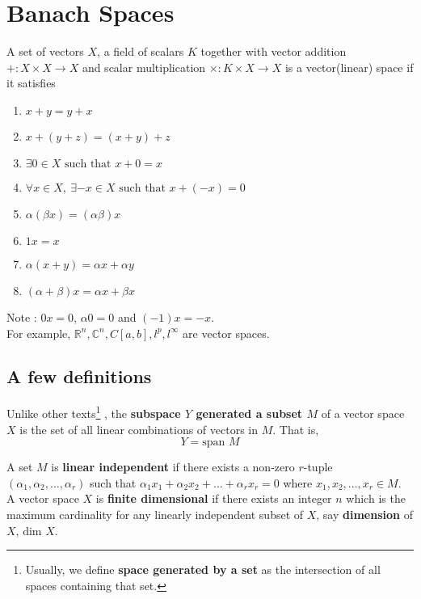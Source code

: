 \section{Banach Spaces}
\begin{definition}
	A set of vectors $X$, a field of scalars $K$ together with vector addition $+ : X \times X \to X$ and scalar multiplication $\times : K \times X \to X$ is a vector(linear) space if it satisfies
	\begin{enumerate}
		\item $x+y = y+x$
		\item $x+(y+z) = (x+y)+z$
		\item $\exists 0 \in X \text{ such that } x+0=x$
		\item $\forall x \in X,\ \exists -x \in X \text{ such that } x+(-x) = 0$
		\item $\alpha (\beta x) = (\alpha\beta)x$
		\item $1x = x$
		\item $\alpha(x+y) = \alpha x + \alpha y$
		\item $(\alpha+\beta)x = \alpha x + \beta x$
	\end{enumerate}
\end{definition}

Note : $0x = 0$, $\alpha 0 = 0$ and $(-1)x = -x$.\\

For example, $\mathbb{R}^n, \mathbb{C}^n, C[a,b], l^p, l^\infty$ are vector spaces.

\subsection{A few definitions}
Unlike other texts\dag\footnote{
	Usually, we define \textbf{space generated by a set} as the intersection of all spaces containing that set.}
, the \textbf{subspace $Y$ generated a subset $M$} of a vector space $X$ is the set of all linear combinations of vectors in $M$.
That is, $$ Y = \text{span } M $$

A set $M$ is \textbf{linear independent} if there exists a non-zero $r$-tuple $(\alpha_1,\alpha_2,\dots,\alpha_r)$ such that $\alpha_1 x_1 + \alpha_2 x_2 + \dots + \alpha_r x_r = 0$ where $x_1,x_2,\dots,x_r \in M$.\\

A vector space $X$ is \textbf{finite dimensional} if there exists an integer $n$ which is the maximum cardinality for any linearly independent subset of $X$, say \textbf{dimension} of $X$, $\text{dim } X$.\\

